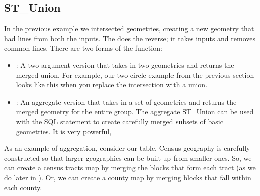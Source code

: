 \documentclass[a4paper,11pt,english]{sphinxmanual}
\begin{document}
\noindent{}


\subsection{ST\_Union}
\label{\detokenize{basic:st-union}}
In the previous example we intersected geometries, creating a new geometry that had lines from both the inputs. The  does the reverse; it takes inputs and removes common lines. There are two forms of the  function:
\begin{itemize}
\item {} 
: A two-argument version that takes in two geometries and returns the merged union.  For example, our two-circle example from the previous section looks like this when you replace the intersection with a union.

\begin{sphinxVerbatim}[commandchars=\\\{\}]

 
   
   
\end{sphinxVerbatim}

\noindent{}

\item {} 
: An aggregate version that takes in a set of geometries and returns the merged geometry for the entire group. The aggregate ST\_Union can be used with the  SQL statement to create carefully merged subsets of basic geometries. It is very powerful,

\end{itemize}

As an example of  aggregation, consider our  table. Census geography is carefully constructed so that larger geographies can be built up from smaller ones. So, we can create a census tracts map by merging the blocks that form each tract (as we do later in ). Or, we can create a county map by merging blocks that fall within each county.
\end{document}
